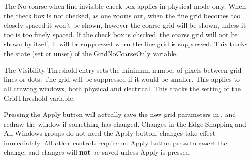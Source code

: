 \begin{description}
The {\cb No coarse when fine invisible} check box applies in physical
mode only.  When the check box is not checked, as one zooms out, when
the fine grid becomes too closely spaced it won't be shown, however
the coarse grid will be shown, unless it too is too finely spaced.  If
the check box is checked, the coarse grid will not be shown by itself,
it will be suppressed when the fine grid is suppressed.  This tracks
the state (set or unset) of the {\et GridNoCoarseOnly} variable.


The {\cb Visibility Threshold} entry sets the minimum number of pixels
between grid lines or dots.  The grid will be suppressed if it would
be smaller.  This applies to all drawing windows, both physical and
electrical.  This tracks the setting of the {\et GridThreshold}
variable.
\end{description}

Pressing the {\cb Apply} button will actually save the new grid
parameters in {\Xic}, and redraw the window if something has changed. 
Changes in the {\cb Edge Snapping} and {\cb All Windows} groups do not
need the {\cb Apply} button, changes take effect immediately.  All
other controls require an {\cb Apply} button press to assert the
change, and changes will {\bf not} be saved unless {\cb Apply} is
pressed.

